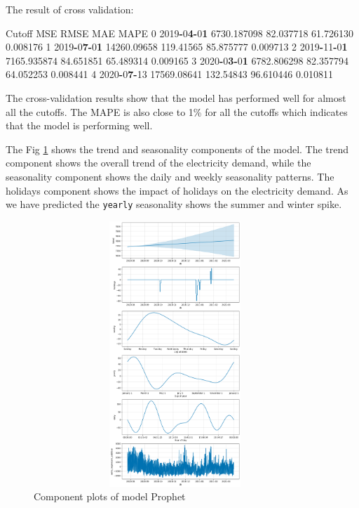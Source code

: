 \documentclass[mstat,12pt]{unswthesis}
\newenvironment{Shaded}{\begin{snugshade}}{\end{snugshade}}
\newcommand{\DecValTok}[1]{\textcolor[rgb]{0.00,0.00,0.81}{#1}}
\newcommand{\ErrorTok}[1]{\textcolor[rgb]{0.64,0.00,0.00}{\textbf{#1}}}
\newcommand{\FloatTok}[1]{\textcolor[rgb]{0.00,0.00,0.81}{#1}}
\newcommand{\NormalTok}[1]{#1}
\newcommand{\OperatorTok}[1]{\textcolor[rgb]{0.81,0.36,0.00}{\textbf{#1}}}
\begin{document}
The result of cross validation:

\begin{Shaded}
\begin{Highlighting}[]
\NormalTok{    Cutoff      MSE           RMSE          MAE         MAPE}
\DecValTok{0}   \DecValTok{2019}\OperatorTok{{-}}\DecValTok{0}\ErrorTok{4}\OperatorTok{{-}}\DecValTok{0}\ErrorTok{1}  \FloatTok{6730.187098}   \FloatTok{82.037718}     \FloatTok{61.726130}   \FloatTok{0.008176}
\DecValTok{1}   \DecValTok{2019}\OperatorTok{{-}}\DecValTok{0}\ErrorTok{7}\OperatorTok{{-}}\DecValTok{0}\ErrorTok{1}  \FloatTok{14260.09658}   \FloatTok{119.41565}     \FloatTok{85.875777}   \FloatTok{0.009713}
\DecValTok{2}   \DecValTok{2019}\OperatorTok{{-}}\DecValTok{11}\OperatorTok{{-}}\DecValTok{0}\ErrorTok{1}  \FloatTok{7165.935874}   \FloatTok{84.651851}     \FloatTok{65.489314}   \FloatTok{0.009165}
\DecValTok{3}   \DecValTok{2020}\OperatorTok{{-}}\DecValTok{0}\ErrorTok{3}\OperatorTok{{-}}\DecValTok{0}\ErrorTok{1}  \FloatTok{6782.806298}   \FloatTok{82.357794}     \FloatTok{64.052253}   \FloatTok{0.008441}
\DecValTok{4}   \DecValTok{2020}\OperatorTok{{-}}\DecValTok{0}\ErrorTok{7}\OperatorTok{{-}}\DecValTok{13}  \FloatTok{17569.08641}   \FloatTok{132.54843}     \FloatTok{96.610446}   \FloatTok{0.010811}
\end{Highlighting}
\end{Shaded}

The cross-validation results show that the model has performed well for
almost all the cutoffs. The MAPE is also close to 1\% for all the
cutoffs which indicates that the model is performing well.

The Fig \ref{prophet_component_plot} shows the trend and seasonality
components of the model. The trend component shows the overall trend of
the electricity demand, while the seasonality component shows the daily
and weekly seasonality patterns. The holidays component shows the impact
of holidays on the electricity demand. As we have predicted the
\texttt{yearly} seasonality shows the summer and winter spike.

\begin{figure}[H]
\centering
\includegraphics[width=0.95\textwidth, height=10cm]{prophet_component_plot.png}
\caption{Component plots of model Prophet}\label{prophet_component_plot}
\end{figure}
\end{document}
